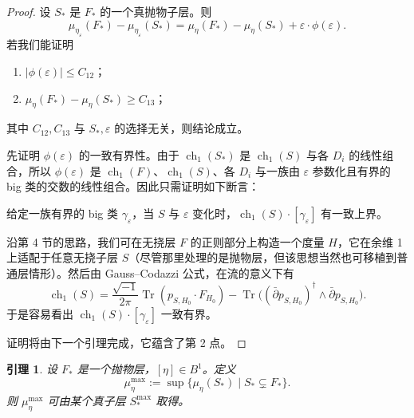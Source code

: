 \documentclass[12pt,a4paper]{article}
\newtheorem{lemma}[theorem]{引理}
\newcommand{\ch}{\operatorname{ch}}
\newcommand{\Tr}{\operatorname{Tr}}
\begin{document}
\begin{proof}
设 \(S_*\) 是 \(F_*\) 的一个真抛物子层。则
\[
\mu_{\eta_\varepsilon}(F_*)-\mu_{\eta_\varepsilon}(S_*)
=
\mu_\eta(F_*)-\mu_\eta(S_*)+\varepsilon\cdot \phi(\varepsilon).
\]
若我们能证明
\begin{enumerate}[label=\arabic*.]
\item \(|\phi(\varepsilon)|\le C_{12}\)；
\item \(\mu_\eta(F_*)-\mu_\eta(S_*)\ge C_{13}\)；
\end{enumerate}
其中 \(C_{12},C_{13}\) 与 \(S_*,\varepsilon\) 的选择无关，则结论成立。

先证明 \(\phi(\varepsilon)\) 的一致有界性。由于 \(\ch_1(S_*)\) 是 \(\ch_1(S)\) 与各 \(D_i\) 的线性组合，所以 \(\phi(\varepsilon)\) 是 \(\ch_1(F)\)、\(\ch_1(S)\)、各 \(D_i\) 与一族由 \(\varepsilon\) 参数化且有界的 big 类的交数的线性组合。因此只需证明如下断言：

\medskip
\noindent
给定一族有界的 big 类 \(\gamma_\varepsilon\)，当 \(S\) 与 \(\varepsilon\) 变化时，\(\ch_1(S)\cdot [\gamma_\varepsilon]\) 有一致上界。
\medskip

沿第 4 节的思路，我们可在无挠层 \(F\) 的正则部分上构造一个度量 \(H\)，它在余维 1 上适配于任意无挠子层 \(S\)（尽管那里处理的是抛物层，但该思想当然也可移植到普通层情形）。然后由 Gauss--Codazzi 公式，在流的意义下有
\[
\ch_1(S)
=
\frac{\sqrt{-1}}{2\pi}\Tr(p_{S,H_0}\cdot F_{H_0})
-
\Tr\bigl((\bar\partial p_{S,H_0})^\dagger\wedge \bar\partial p_{S,H_0}\bigr).
\]
于是容易看出 \(\ch_1(S)\cdot [\gamma_\varepsilon]\) 一致有界。

证明将由下一个引理完成，它蕴含了第 2 点。
\end{proof}

\begin{lemma}
设 \(F_*\) 是一个抛物层，\([\eta]\in B^1\)。定义
\[
\mu_\eta^{\max}:=\sup\{\mu_\eta(S_*)\mid S_*\subsetneq F_*\}.
\]
则 \(\mu_\eta^{\max}\) 可由某个真子层 \(S_*^{\max}\) 取得。
\end{lemma}
\end{document}
